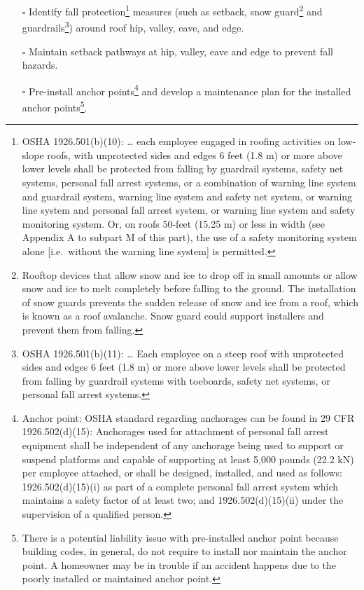 \documentclass[]{article}
\providecommand{\tightlist}{%
  \setlength{\itemsep}{0pt}\setlength{\parskip}{0pt}}
\let\rmarkdownfootnote\footnote%
\def\footnote{\protect\rmarkdownfootnote}
\begin{document}
\begin{itemize}
\tightlist
\item[$\square$]
  Identify fall protection\footnote{OSHA 1926.501(b)(10): \ldots{} each
    employee engaged in roofing activities on low-slope roofs, with
    unprotected sides and edges 6 feet (1.8 m) or more above lower
    levels shall be protected from falling by guardrail systems, safety
    net systems, personal fall arrest systems, or a combination of
    warning line system and guardrail system, warning line system and
    safety net system, or warning line system and personal fall arrest
    system, or warning line system and safety monitoring system. Or, on
    roofs 50-feet (15.25 m) or less in width (see Appendix A to subpart
    M of this part), the use of a safety monitoring system alone
    {[}i.e.~without the warning line system{]} is permitted.} measures
  (such as setback, snow guard\footnote{Rooftop devices that allow snow
    and ice to drop off in small amounts or allow snow and ice to melt
    completely before falling to the ground. The installation of snow
    guards prevents the sudden release of snow and ice from a roof,
    which is known as a roof avalanche. Snow guard could support
    installers and prevent them from falling.} and guardrails\footnote{OSHA
    1926.501(b)(11): \ldots{} Each employee on a steep roof with
    unprotected sides and edges 6 feet (1.8 m) or more above lower
    levels shall be protected from falling by guardrail systems with
    toeboards, safety net systems, or personal fall arrest systems.})
  around roof hip, valley, eave, and edge.
\item[$\square$]
  Maintain setback pathways at hip, valley, eave and edge to prevent
  fall hazards.
\item[$\square$]
  Pre-install anchor points\footnote{Anchor point: OSHA standard
    regarding anchorages can be found in 29 CFR 1926.502(d)(15):
    Anchorages used for attachment of personal fall arrest equipment
    shall be independent of any anchorage being used to support or
    suspend platforms and capable of supporting at least 5,000 pounds
    (22.2 kN) per employee attached, or shall be designed, installed,
    and used as follows: 1926.502(d)(15)(i) as part of a complete
    personal fall arrest system which maintains a safety factor of at
    least two; and 1926.502(d)(15)(ii) under the supervision of a
    qualified person.} and develop a maintenance plan for the installed
  anchor points\footnote{There is a potential liability issue with
    pre-installed anchor point because building codes, in general, do
    not require to install nor maintain the anchor point. A homeowner
    may be in trouble if an accident happens due to the poorly installed
    or maintained anchor point.}.
\end{itemize}
\end{document}
